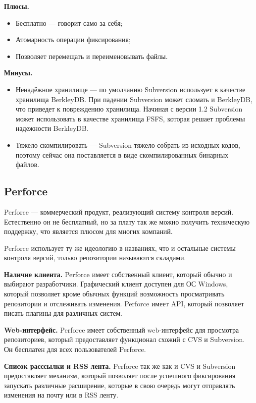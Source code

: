 \textbf{Плюсы.}
\begin{itemize}
\item Бесплатно --- говорит само за себя;
\item Атомарность операции фиксирования;
\item Позволяет перемещать и переименовывать файлы.
\end{itemize}


\textbf{Минусы.}
\begin{itemize}
\item Ненадёжное хранилище --- по умолчанию Subversion использует в качестве хранилища BerkleyDB. При падении Subversion может сломать и BerkleyDB, что приведет к повреждению хранилища. Начиная с версии 1.2 Subversion может использовать в качестве хранилища FSFS, которая решает проблемы надежности BerkleyDB.

\item Тяжело скомпилировать --- Subversion тяжело собрать из исходных кодов, поэтому сейчас она поставляется в виде скомпилированных бинарных файлов.
\end{itemize}


\subsection{ Perforce } \label{sect2_4_4}

Perforce --- коммерческий продукт, реализующий систему контроля версий. Естественно он не бесплатный, но за плату так же можно получить техническую поддержку, что является плюсом для многих компаний.

Perforce использует ту же идеологию в названиях, что и остальные системы контроля версий, только репозитории называются складами.


\textbf{Наличие клиента.} Perforce имеет собственный клиент, который обычно и выбирают разработчики. Графический клиент доступен для ОС Windows, который позволяет кроме обычных функций возможность просматривать репозитории и отслеживать изменения. Perforce имеет API, который позволяет писать плагины для различных систем.

\textbf{Web-интерфейс.} Perforce имеет собственный web-интерфейс для просмотра репозиториев, который предоставляет функционал схожий с CVS и Subversion. Он бесплатен для всех пользователей Perforce.

\textbf{Список расссылки и RSS лента.} Perforce так же как и CVS и Subversion предоставляет механизм, который позволяет после успешного фиксирования запускать различные расширение, которые в свою очередь могут отправлять изменения на почту или в RSS ленту.

